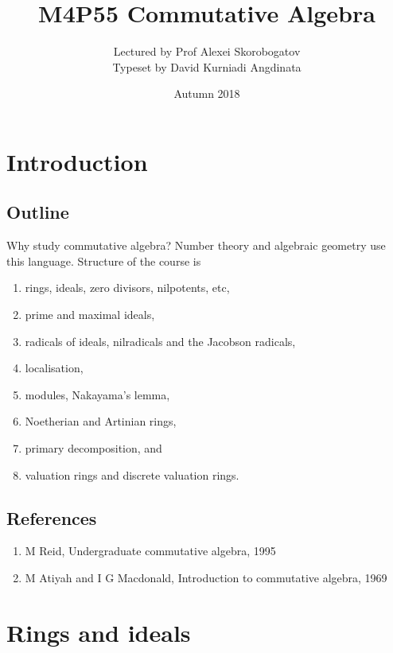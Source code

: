 \documentclass{article}
\title{M4P55 Commutative Algebra}
\author{Lectured by Prof Alexei Skorobogatov \\ Typeset by David Kurniadi Angdinata}
\date{Autumn 2018}
\theoremstyle{definition}\newtheorem{definition}{Definition}[section]
\theoremstyle{definition}\newtheorem{remark}[definition]{Remark}
\theoremstyle{definition}\newtheorem*{example}{Example}
\theoremstyle{definition}\newtheorem*{note}{Note}
\begin{document}
\maketitle

\vfill

\tableofcontents

\pagebreak


\section{Introduction}

\subsection{Outline}

Why study commutative algebra? Number theory and algebraic geometry use this language. Structure of the course is
\begin{enumerate}
\item rings, ideals, zero divisors, nilpotents, etc,
\item prime and maximal ideals,
\item radicals of ideals, nilradicals and the Jacobson radicals,
\item localisation,
\item modules, Nakayama's lemma,
\item Noetherian and Artinian rings,
\item primary decomposition, and
\item valuation rings and discrete valuation rings.
\end{enumerate}

\subsection{References}

\begin{enumerate}
\item M Reid, Undergraduate commutative algebra, 1995
\item M Atiyah and I G Macdonald, Introduction to commutative algebra, 1969
\end{enumerate}

\section{Rings and ideals}
\end{document}
